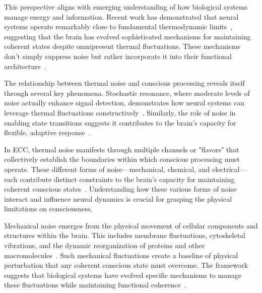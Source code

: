 This perspective aligns with emerging understanding of how biological systems manage energy and information. Recent work has demonstrated that neural systems operate remarkably close to fundamental thermodynamic limits~\cite{parrondo2015}, suggesting that the brain has evolved sophisticated mechanisms for maintaining coherent states despite omnipresent thermal fluctuations. These mechanisms don't simply suppress noise but rather incorporate it into their functional architecture~\cite{demetrius2015}.

The relationship between thermal noise and conscious processing reveals itself through several key phenomena. Stochastic resonance, where moderate levels of noise actually enhance signal detection, demonstrates how neural systems can leverage thermal fluctuations constructively~\cite{mcdonnell2011}. Similarly, the role of noise in enabling state transitions suggests it contributes to the brain's capacity for flexible, adaptive response~\cite{kelso2012}.

In ECC, thermal noise manifests through multiple channels or "flavors" that collectively establish the boundaries within which conscious processing must operate. These different forms of noise—mechanical, chemical, and electrical—each contribute distinct constraints to the brain's capacity for maintaining coherent conscious states~\cite{faisal2008}. Understanding how these various forms of noise interact and influence neural dynamics is crucial for grasping the physical limitations on consciousness.

Mechanical noise emerges from the physical movement of cellular components and structures within the brain. This includes membrane fluctuations, cytoskeletal vibrations, and the dynamic reorganization of proteins and other macromolecules~\cite{attwell2001}. Such mechanical fluctuations create a baseline of physical perturbation that any coherent conscious state must overcome. The framework suggests that biological systems have evolved specific mechanisms to manage these fluctuations while maintaining functional coherence~\cite{breakspear2005dynamics}.

